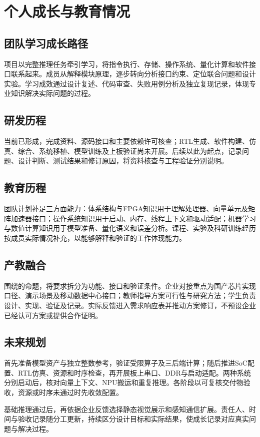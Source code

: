 \section{个人成长与教育情况}
\subsection{团队学习成长路径}

项目以完整推理任务牵引学习，将指令执行、存储、操作系统、量化计算和软件接口联系起来。成员从解释模块原理，逐步转向分析接口约束、定位联合问题和设计实验。学习成效通过设计复述、代码审查、失败用例分析及独立复现记录，体现专业知识解决实际问题的过程。\cite{reviewrules}

\subsection{研发历程}

当前已形成\SourceTechnicalReportName{}，完成资料、源码接口和主要依赖许可核查；RTL生成、软件构建、仿真、综合、系统移植、模型训练及上板验证尚未开展。后续以此为起点，记录问题、设计判断、测试结果和修订原因，将资料核查与工程验证分别说明。\cite{technicalreport}

\subsection{教育历程}

团队计划补足三方面能力：体系结构与FPGA知识用于理解处理器、向量单元及矩阵加速器接口；操作系统知识用于启动、内存、线程上下文和驱动适配；机器学习与数值计算知识用于模型准备、量化语义和误差分析。课程、实验及科研训练经历按成员实际情况补充，以能够解释和验证的工作体现能力。

\subsection{产教融合}

围绕\ChallengeCompany{}的命题，将要求拆分为功能、接口和验证条件。企业对接重点为国产芯片实现口径、演示场景及移动数据中心接口；教师指导方案可行性与研究方法；学生负责设计、实现、验证及记录。实际反馈进入需求响应表并推动方案修订，不预设企业已经认可方案或提供合作证明。

\subsection{未来规划}

首先准备模型资产与独立整数参考，验证受限算子及三后端计算；随后推进SoC配置、RTL仿真、资源和时序检查，再开展板上串口、DDR与启动适配。两种系统分别启动后，核对向量上下文、NPU搬运和重复推理。各阶段以可复核交付物验收，资源或时序未通过时先收敛配置。

基础推理通过后，再依据企业反馈选择静态视觉展示和感知通信扩展。责任人、时间与验收记录随分工更新，持续区分设计目标和实际结果，使成长记录对应真实问题与解决过程。

